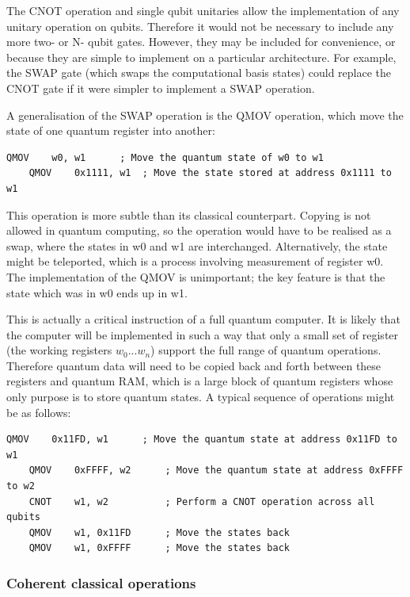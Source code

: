 The CNOT operation and single qubit unitaries allow the implementation of any unitary operation on qubits. Therefore it would not be necessary to include any more two- or N- qubit gates. However, they may be included for convenience, or because they are simple to implement on a particular architecture. For example, the SWAP gate (which swaps the computational basis states) could replace the CNOT gate if it were simpler to implement a SWAP operation. 

A generalisation of the SWAP operation is the QMOV operation, which move the state of one quantum register into another:

\begin{lstlisting}[language=Asm,caption={QMOV operations}]
    QMOV    w0, w1      ; Move the quantum state of w0 to w1
    QMOV    0x1111, w1  ; Move the state stored at address 0x1111 to w1
\end{lstlisting}

This operation is more subtle than its classical counterpart. Copying is not allowed in quantum computing, so the operation would have to be realised as a swap, where the states in w0 and w1 are interchanged. Alternatively, the state might be teleported, which is a process involving measurement of register w0. The implementation of the QMOV is unimportant; the key feature is that the state which was in w0 ends up in w1.

This is actually a critical instruction of a full quantum computer. It is likely that the computer will be implemented in such a way that only a small set of register (the working registers $w_0...w_n$) support the full range of quantum operations. Therefore quantum data will need to be copied back and forth between these registers and quantum RAM, which is a large block of quantum registers whose only purpose is to store quantum states. A typical sequence of operations might be as follows:

\begin{lstlisting}[language=Asm,caption={Adding }]
    QMOV    0x11FD, w1      ; Move the quantum state at address 0x11FD to w1
    QMOV    0xFFFF, w2      ; Move the quantum state at address 0xFFFF to w2
    CNOT    w1, w2          ; Perform a CNOT operation across all qubits
    QMOV    w1, 0x11FD      ; Move the states back
    QMOV    w1, 0xFFFF      ; Move the states back
\end{lstlisting}

\subsubsection{Coherent classical operations}

